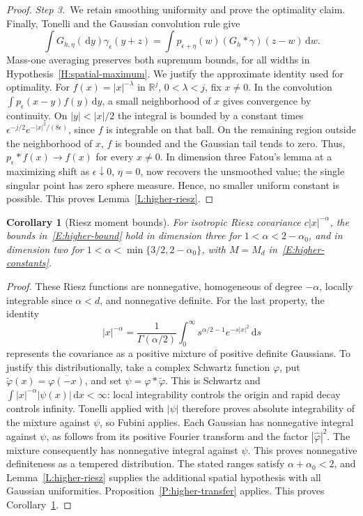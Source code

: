\documentclass[12pt,oneside,openany]{book}
\numberwithin{equation}{section}
\newtheorem{corollary}[theorem]{Corollary}
\theoremstyle{nogostyle}
\theoremstyle{definition}
\newcommand{\R}{\mathbb{R}}
\newcommand{\ud}{\,\mathrm{d}}
\begin{document}
\begin{proof}
  \medskip
  \noindent\textit{Step 3.~}We retain smoothing uniformity and prove the
  optimality claim.
  Finally, Tonelli and the Gaussian convolution rule give
  \[
    \int G_{h,\eta}(\ud y)\gamma_\epsilon(y+z)
    =\int p_{\epsilon+\eta}(w)(G_h*\gamma)(z-w)\ud w.
  \]
  Mass-one averaging preserves both supremum bounds, for all widths in
  Hypothesis~\ref{H:spatial-maximum}. We justify the approximate identity used
  for optimality. For $f(x) = |x|^{-\lambda}$ in $\R^j$, $0 < \lambda < j$, fix
  $x \ne 0$. In the convolution $\int p_\epsilon(x-y)f(y)\ud y$, a small
  neighborhood of $x$ gives convergence by continuity. On $|y| < |x|/2$ the
  integral is bounded by a constant times
  $\epsilon^{-j/2}e^{-|x|^2/(8\epsilon)}$, since $f$ is integrable on that ball.
  On the remaining region outside the neighborhood of $x$, $f$ is bounded and
  the Gaussian tail tends to zero. Thus, $p_\epsilon*f(x) \to f(x)$ for every $x
  \ne 0$. In dimension three Fatou's lemma at a maximizing shift as
  $\epsilon\downarrow0$, $\eta = 0$, now recovers the unsmoothed value; the
  single singular point has zero sphere measure. Hence, no smaller uniform
  constant is possible. This proves Lemma~\ref{L:higher-riesz}.
\end{proof}

\begin{corollary}[Riesz moment bounds]\label{C:higher-riesz}
  For isotropic Riesz covariance $c|x|^{-\alpha}$, the bounds
  in~\eqref{E:higher-bound} hold in dimension three for $1 < \alpha <
  2-\alpha_0$, and in dimension two for $1 < \alpha < \min\{3/2,2-\alpha_0\}$,
  with $M = M_d$ in~\eqref{E:higher-constants}.
\end{corollary}

\begin{proof}
  These Riesz functions are nonnegative, homogeneous of degree $-\alpha$,
  locally integrable since $\alpha < d$, and nonnegative definite. For the last
  property, the identity
  \[
    |x|^{-\alpha}=\frac1{\Gamma(\alpha/2)}
    \int_0^\infty s^{\alpha/2-1}e^{-s|x|^2}\ud s
  \]
  represents the covariance as a positive mixture of positive definite
  Gaussians. To justify this distributionally, take a complex Schwartz function
  $\varphi$, put $\widetilde{\varphi}(x) = \overline{\varphi(-x)}$, and set
  $\psi = \varphi*\widetilde{\varphi}$. This is Schwartz and $\int
  |x|^{-\alpha}|\psi(x)|\ud x < \infty$: local integrability controls the origin
  and rapid decay controls infinity. Tonelli applied with $|\psi|$ therefore
  proves absolute integrability of the mixture against $\psi$, so Fubini
  applies. Each Gaussian has nonnegative integral against $\psi$, as follows
  from its positive Fourier transform and the factor $|\widehat{\varphi}|^2$.
  The mixture consequently has nonnegative integral against $\psi$. This proves
  nonnegative definiteness as a tempered distribution. The stated ranges satisfy
  $\alpha+\alpha_0 < 2$, and Lemma~\ref{L:higher-riesz} supplies the additional
  spatial hypothesis with all Gaussian uniformities.
  Proposition~\ref{P:higher-transfer} applies. This proves
  Corollary~\ref{C:higher-riesz}.
\end{proof}
\end{document}
